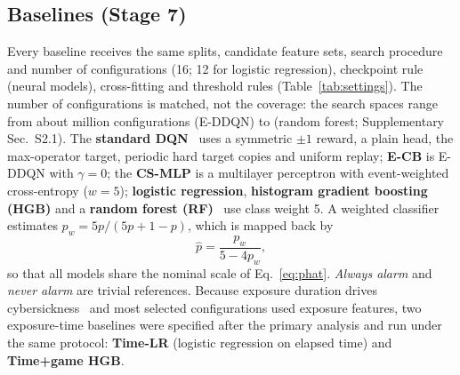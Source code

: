 \subsection{Baselines (Stage 7)}
\label{sec:baselines}
Every baseline receives the same splits, candidate feature sets, search procedure and number of configurations (16; 12 for logistic regression), checkpoint rule (neural models), cross-fitting and threshold rules (Table~\ref{tab:settings}). The number of configurations is matched, not the coverage: the search spaces range from about \PHSpaceEDDQNMillion{} million configurations (E-DDQN) to \PHSpaceRF{} (random forest; Supplementary Sec.~S2.1). The \textbf{standard DQN}~\cite{mnih2015human} uses a symmetric $\pm1$ reward, a plain head, the max-operator target, periodic hard target copies and uniform replay; \textbf{E-CB} is E-DDQN with $\gamma=0$; the \textbf{CS-MLP} is a multilayer perceptron with event-weighted cross-entropy ($w=5$); \textbf{logistic regression}, \textbf{histogram gradient boosting (HGB)} and a \textbf{random forest (RF)}~\cite{pedregosa2011sklearn} use class weight 5. A weighted classifier estimates $p_w=5p/(5p+1-p)$, which is mapped back by
\begin{equation}
\hat p=\frac{p_w}{5-4p_w},
\label{eq:unweight}
\end{equation}
so that all models share the nominal scale of Eq.~\eqref{eq:phat}. \emph{Always alarm} and \emph{never alarm} are trivial references. Because exposure duration drives cybersickness~\cite{kennedy2000duration} and most selected configurations used exposure features, two exposure-time baselines were specified after the primary analysis and run under the same protocol: \textbf{Time-LR} (logistic regression on elapsed time) and \textbf{Time+game HGB}.

